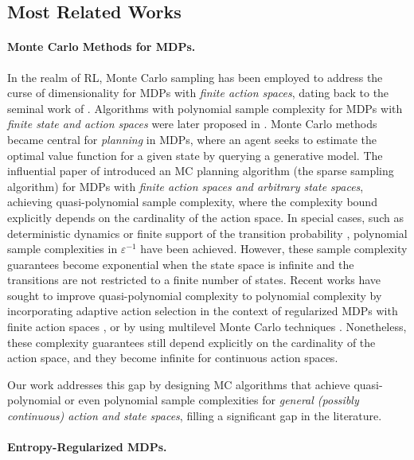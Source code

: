 \documentclass[11pt]{article}
\numberwithin{equation}{section}
\theoremstyle{definition}
\theoremstyle{remark}
\newcommand{\citep}{\cite}
\newcommand{\citet}{\cite}
\begin{document}
\subsection{Most Related Works}
\label{subsection:related-work}


\paragraph{Monte Carlo Methods for MDPs.}

 In the realm of RL, Monte Carlo sampling has been employed to address the curse of dimensionality for MDPs with \emph{finite action spaces}, dating back to the seminal work of \citet{rust1997usingrandomization}. Algorithms with polynomial sample complexity for MDPs with \emph{finite state and action spaces} were later proposed in \citet{kearns2002near}. Monte Carlo methods became central for \emph{planning} in MDPs, where an agent seeks to estimate the optimal value function for a given state by querying a generative model. The influential paper of \citet{kearns2002sparse} introduced an MC planning algorithm (the sparse sampling algorithm) for MDPs with \emph{finite action spaces and arbitrary state spaces}, achieving quasi-polynomial sample complexity, where the complexity bound explicitly depends on the cardinality of the action space.
In special cases, such as deterministic dynamics \citep{hren2008optimistic} or finite support of the transition probability \citep{szorenyi2014optimistic, jonsson2020planning}, polynomial sample complexities in $\varepsilon^{-1}$ have been achieved. However,  these sample complexity guarantees become exponential
when the state space is infinite and the transitions are not restricted to a finite number of states. Recent works have sought to improve quasi-polynomial complexity to polynomial complexity by incorporating adaptive action selection in the context of regularized MDPs with finite action spaces \citep{grill2019planning}, or by using multilevel Monte Carlo techniques \citep{beck2023nonlinearmontecarlomethods}. Nonetheless, these complexity guarantees still depend explicitly on the cardinality of the action space, and they become infinite for continuous action spaces.

Our work addresses this gap by designing MC algorithms that achieve quasi-polynomial or even polynomial sample complexities for \emph{general (possibly continuous) action and state spaces}, filling a significant gap in the literature.


\paragraph{Entropy-Regularized MDPs.}
\end{document}
